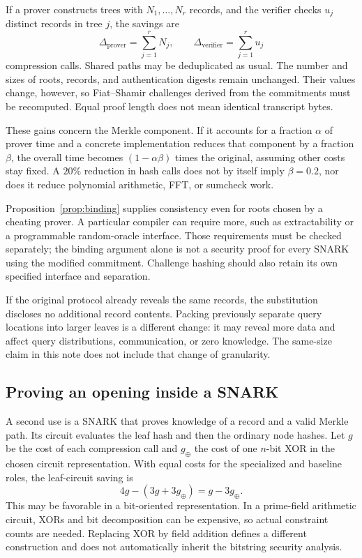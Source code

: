 \documentclass[11pt,letterpaper]{article}
\theoremstyle{definition} %
\begin{document}
If a prover constructs trees with $N_1,\ldots,N_r$ records, and the verifier
checks $u_j$ distinct records in tree $j$, the savings are
\begin{equation}
 \Delta_{\mathrm{prover}}=\sum_{j=1}^r N_j,
 \qquad
 \Delta_{\mathrm{verifier}}=\sum_{j=1}^r u_j
 \label{eq:snark}
\end{equation}
compression calls. Shared paths may be deduplicated as usual. The number
and sizes of roots, records, and authentication digests remain unchanged.
Their values change, however, so Fiat--Shamir challenges derived from the
commitments must be recomputed. Equal proof length does not mean identical
transcript bytes.

These gains concern the Merkle component. If it accounts for a fraction
$\alpha$ of prover time and a concrete implementation reduces that component
by a fraction $\beta$, the overall time becomes $(1-\alpha\beta)$ times
the original, assuming other costs stay fixed. A $20\%$ reduction in hash
calls does not by itself imply $\beta=0.2$, nor does it reduce polynomial
arithmetic, FFT, or sumcheck work.

Proposition~\ref{prop:binding} supplies consistency even for roots chosen by
a cheating prover. A particular compiler can require more, such as
extractability or a programmable random-oracle interface. Those requirements
must be checked separately; the binding argument alone is not a security
proof for every SNARK using the modified commitment. Challenge hashing
should also retain its own specified interface and separation.

If the original protocol already reveals the same records, the substitution
discloses no additional record contents. Packing previously separate query
locations into larger leaves is a different change: it may reveal more data
and affect query distributions, communication, or zero knowledge. The
same-size claim in this note does not include that change of granularity.

\subsection{Proving an opening inside a SNARK}
A second use is a SNARK that proves knowledge of a record and a valid Merkle
path. Its circuit evaluates the leaf hash and then the ordinary node hashes.
Let $g$ be the cost of each compression call and $g_{\oplus}$ the cost of
one $n$-bit XOR in the chosen circuit representation. With equal costs for
the specialized and baseline roles, the leaf-circuit saving is
\[
 4g-(3g+3g_{\oplus})=g-3g_{\oplus}.
\]
This may be favorable in a bit-oriented representation. In a prime-field
arithmetic circuit, XORs and bit decomposition can be expensive, so actual
constraint counts are needed. Replacing XOR by field addition defines a
different construction and does not automatically inherit the bitstring
security analysis.
\end{document}
